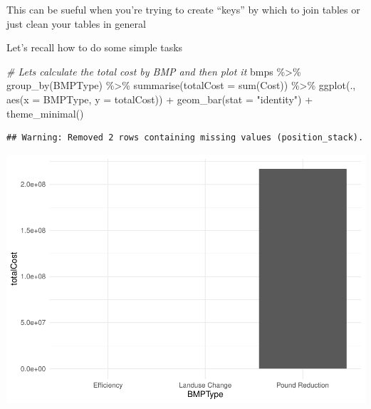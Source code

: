 \documentclass[]{article}
\newenvironment{Shaded}{\begin{snugshade}}{\end{snugshade}}
\newcommand{\AttributeTok}[1]{\textcolor[rgb]{0.77,0.63,0.00}{#1}}
\newcommand{\CommentTok}[1]{\textcolor[rgb]{0.56,0.35,0.01}{\textit{#1}}}
\newcommand{\FunctionTok}[1]{\textcolor[rgb]{0.00,0.00,0.00}{#1}}
\newcommand{\NormalTok}[1]{#1}
\newcommand{\SpecialCharTok}[1]{\textcolor[rgb]{0.00,0.00,0.00}{#1}}
\newcommand{\StringTok}[1]{\textcolor[rgb]{0.31,0.60,0.02}{#1}}
\begin{document}
This can be sueful when you're trying to create ``keys'' by which to
join tables or just clean your tables in general

Let's recall how to do some simple tasks

\begin{Shaded}
\begin{Highlighting}[]
\CommentTok{\# Let\textquotesingle{}s calculate the total cost by BMP and then plot it}
\NormalTok{bmps }\SpecialCharTok{\%\textgreater{}\%} \FunctionTok{group\_by}\NormalTok{(BMPType) }\SpecialCharTok{\%\textgreater{}\%} \FunctionTok{summarise}\NormalTok{(}\AttributeTok{totalCost =} \FunctionTok{sum}\NormalTok{(Cost)) }\SpecialCharTok{\%\textgreater{}\%}
  \FunctionTok{ggplot}\NormalTok{(., }\FunctionTok{aes}\NormalTok{(}\AttributeTok{x =}\NormalTok{ BMPType, }\AttributeTok{y =}\NormalTok{ totalCost)) }\SpecialCharTok{+}
  \FunctionTok{geom\_bar}\NormalTok{(}\AttributeTok{stat =} \StringTok{"identity"}\NormalTok{) }\SpecialCharTok{+}
  \FunctionTok{theme\_minimal}\NormalTok{()}
\end{Highlighting}
\end{Shaded}

\begin{verbatim}
## Warning: Removed 2 rows containing missing values (position_stack).
\end{verbatim}

\includegraphics{lab02_files/figure-latex/review-1.pdf}

\begin{Shaded}
\end{Shaded}
\end{document}
